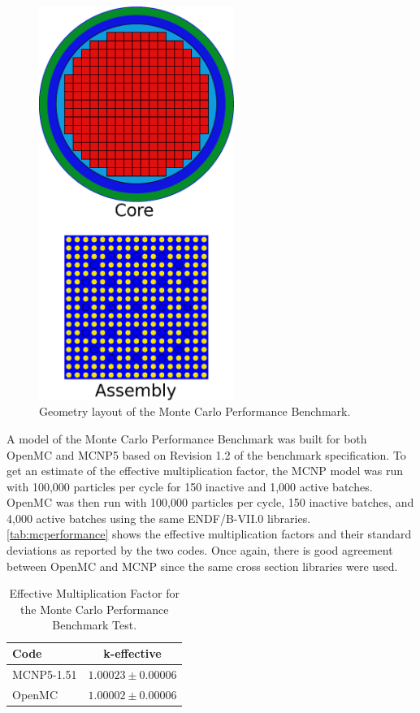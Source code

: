 \documentclass[authoryear,preprint]{elsarticle}
\begin{document}
\begin{figure}[!ht]
  \centering
  \includegraphics[width=2.5in]{mcperformance.eps}
  \caption{Geometry layout of the Monte Carlo Performance Benchmark.}
  \label{fig:core}
\end{figure}

A model of the Monte Carlo Performance Benchmark was built for both OpenMC and
MCNP5 based on Revision 1.2 of the benchmark specification. To get an estimate
of the effective multiplication factor, the MCNP model was run with 100,000
particles per cycle for 150 inactive and 1,000 active batches. OpenMC was then
run with 100,000 particles per cycle, 150 inactive batches, and 4,000 active
batches using the same ENDF/B-VII.0 libraries. \autoref{tab:mcperformance} shows
the effective multiplication factors and their standard deviations as reported
by the two codes. Once again, there is good agreement between OpenMC and MCNP
since the same cross section libraries were used.

\begin{table}
  \caption{Effective Multiplication Factor for the Monte Carlo Performance
    Benchmark Test.}
  \label{tab:mcperformance}
  \begin{center}
  \begin{tabular}{ l c }
    \hline
    Code & k-effective \\
    \hline
    MCNP5-1.51 & $1.00023 \pm 0.00006$ \\
    OpenMC     & $1.00002 \pm 0.00006$ \\
    \hline
  \end{tabular}
  \end{center}
\end{table}
\end{document}
